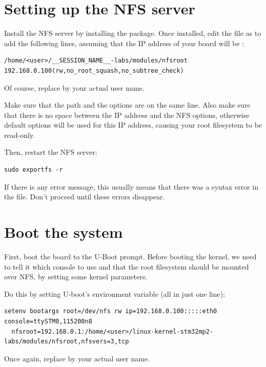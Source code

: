 \section{Setting up the NFS server}

Install the NFS server by installing the 
package. Once installed, edit the  file as
 to add the following lines, assuming that the IP address
of your board will be :

\scriptsize
\begin{verbatim}
/home/<user>/__SESSION_NAME__-labs/modules/nfsroot 192.168.0.100(rw,no_root_squash,no_subtree_check)
\end{verbatim}
\normalsize

Of course, replace  by your actual user name.

Make sure that the path and the options are on the same line.
Also make sure that there is no space between the IP address and the NFS
options, otherwise default options will be used for this IP address,
causing your root filesystem to be read-only.

Then, restart the NFS server:

\begin{verbatim}
sudo exportfs -r
\end{verbatim}

If there is any error message, this usually means that there was a
syntax error in the  file. Don't proceed until these
errors disappear.

\section{Boot the system}

First, boot the board to the U-Boot prompt. Before booting the kernel,
we need to tell it which console to use and that the root filesystem
should be mounted over NFS, by setting some kernel parameters.

Do this by setting U-boot's  environment variable (all in
just one line):

\begin{verbatim}
setenv bootargs root=/dev/nfs rw ip=192.168.0.100:::::eth0 console=ttySTM0,115200n8
  nfsroot=192.168.0.1:/home/<user>/linux-kernel-stm32mp2-labs/modules/nfsroot,nfsvers=3,tcp
\end{verbatim}

Once again, replace  by your actual user name.


